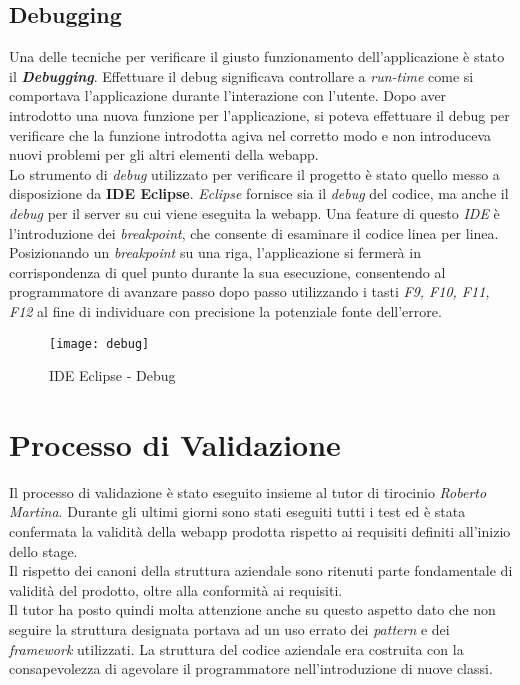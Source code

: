 \subsection{Debugging}
Una delle tecniche per verificare il giusto funzionamento dell'applicazione è stato il \textit{\textbf{Debugging}}. Effettuare il debug significava controllare a \textit{run-time} come si comportava l'applicazione durante l'interazione con l'utente. Dopo aver introdotto una nuova funzione per l'applicazione, si poteva effettuare il debug per verificare che la funzione introdotta agiva nel corretto modo e non introduceva nuovi problemi per gli altri elementi della webapp. \\
Lo strumento di \textit{debug} utilizzato per verificare il progetto è stato quello messo a disposizione da \textbf{IDE Eclipse}. \textit{Eclipse} fornisce sia il \textit{debug} del codice, ma anche il \textit{debug} per il server su cui viene eseguita la webapp.
Una feature di questo \textit{IDE} è l'introduzione dei \textit{breakpoint}, che consente di esaminare il codice linea per linea.\\ Posizionando un \textit{breakpoint} su una riga, l'applicazione si fermerà in corrispondenza di quel punto durante la sua esecuzione, consentendo al programmatore di avanzare passo dopo passo utilizzando i tasti \textit{F9, F10, F11, F12} al fine di individuare con precisione la potenziale fonte dell'errore.

\begin{figure}[H]
\bigskip
    \centering 
    \texttt{[image: debug]} 
    \bigskip
    \caption{IDE Eclipse - Debug}
\end{figure}
\bigskip
\bigskip
\section{Processo di Validazione}
Il processo di validazione è stato eseguito insieme al tutor di tirocinio \textit{Roberto Martina}. Durante gli ultimi giorni sono stati eseguiti tutti i test ed è stata confermata la validità della webapp prodotta rispetto ai requisiti definiti all'inizio dello stage. \\
Il rispetto dei canoni della struttura aziendale sono ritenuti parte fondamentale di validità del prodotto, oltre alla conformità ai requisiti. \\
Il tutor ha posto quindi molta attenzione anche su questo aspetto dato che non seguire la struttura designata portava ad un uso errato dei \textit{pattern} e dei \textit{framework} utilizzati. La struttura del codice aziendale era costruita con la consapevolezza di agevolare il programmatore nell'introduzione di nuove classi.